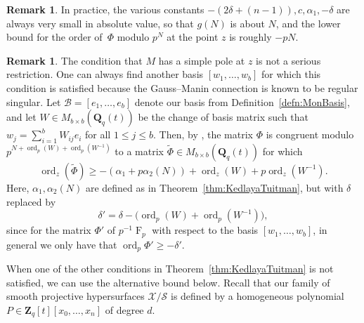 \documentclass[a4paper,11pt]{article}
\numberwithin{equation}{section}
\newcommand{\ZZ}{\mathbf{Z}} %
\newcommand{\QQ}{\mathbf{Q}} %
\DeclareMathOperator{\ord}{ord}          %
\DeclareMathOperator{\Frob}{F}           %
\providecommand{\cB}{\mathcal{B}} %
\theoremstyle{definition}
\newtheorem{rem}[thm]{Remark}
\begin{document}
\begin{rem}
In practice, the various constants $-(2 \delta + (n-1)), c, \alpha_1, -\delta$ 
are always very small in absolute value, so that $g(N)$ is about $N$, and 
the lower bound for the order of~$\Phi$ modulo $p^N$ at the point $z$ is 
roughly $-pN$.
\end{rem}

\begin{rem} \label{rem:basischange}
The condition that $M$ has a simple pole at $z$ is not a serious restriction. 
One can always find another basis $[w_1, \dotsc, w_b]$ for which this condition is 
satisfied because the Gauss--Manin connection is known to be regular singular. 
Let $\cB=[e_1,\dotsc,e_b]$ denote our basis from Definition~\ref{defn:MonBasis},
and let $W \in M_{b \times b}(\QQ_q(t))$ 
be the change of basis matrix such that $w_j = \sum_{i=1}^b W_{ij} e_i$ for all 
$1 \leq j \leq b$. Then, by \citep[Corollary 2.6]{KedlayaTuitman2012}, the matrix 
$\Phi$ %
is congruent modulo $p^{N+\ord_p(W)+\ord_p(W^{-1})}$ 
to a matrix $\tilde{\Phi} \in M_{b \times b}(\QQ_q(t))$ for which
\[
\ord_z(\tilde{\Phi}) \geq -(\alpha_1+p \alpha_2(N))+\ord_z(W)+p\ord_z(W^{-1}).
\]
Here, $\alpha_1, \alpha_2(N)$ are defined as in 
Theorem~\ref{thm:KedlayaTuitman}, but with $\delta$ replaced by
\begin{equation*}
\delta' = \delta-\bigl(\ord_p(W)+\ord_p(W^{-1})\bigr), 
\end{equation*}
since for the matrix $\Phi'$ of $p^{-1}\Frob_p$ with respect to the basis 
$[w_1,\dotsc,w_b]$, in general we only have that $\ord_p{\Phi'} \geq -\delta'$. 
\end{rem}

When one of the other conditions in Theorem~\ref{thm:KedlayaTuitman} is not satisfied,
we can use the alternative bound below. Recall that our family of smooth projective 
hypersurfaces $\mathcal{X}/\mathcal{S}$ is defined by a homogeneous polynomial 
$P \in \ZZ_q[t][x_0,\dotsc,x_n]$ of degree $d$.
\end{document}
